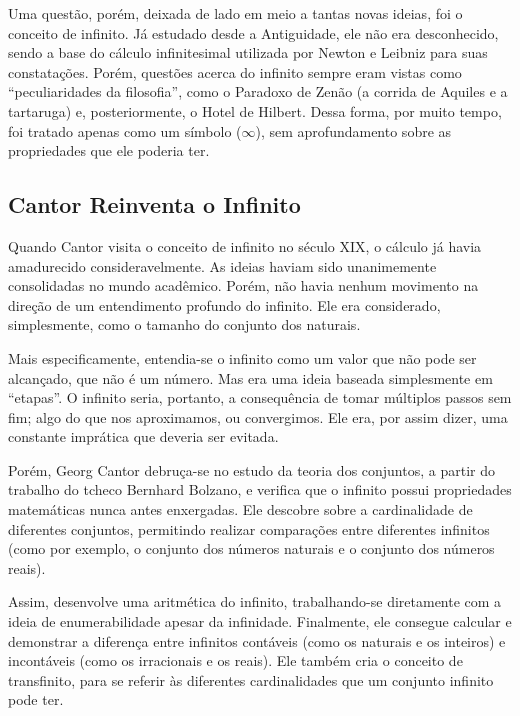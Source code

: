 \documentclass[journal,transmag]{IEEEtran}
\begin{document}
Uma questão, porém, deixada de lado em meio a tantas novas ideias,
foi o conceito de infinito. Já estudado desde a Antiguidade,
ele não era desconhecido, sendo a base do cálculo infinitesimal
utilizada por Newton e Leibniz para suas constatações.
Porém, questões acerca do infinito sempre eram vistas como
``peculiaridades da filosofia'', como o Paradoxo de Zenão
(a corrida de Aquiles e a tartaruga) e, posteriormente, o
Hotel de Hilbert. Dessa forma, por muito tempo, foi tratado apenas
como um símbolo ($\infty$), sem aprofundamento sobre as propriedades
que ele poderia ter.





\subsection{Cantor Reinventa o Infinito}
Quando Cantor visita o conceito de infinito no século XIX,
o cálculo já havia amadurecido consideravelmente. As ideias haviam
sido unanimemente consolidadas no mundo acadêmico. Porém, não havia
nenhum movimento na direção de um entendimento profundo do infinito.
Ele era considerado, simplesmente, como o tamanho do conjunto dos
naturais.

Mais especificamente, entendia-se o infinito como um valor que não pode ser alcançado, que não é um número. Mas era uma ideia baseada
simplesmente em ``etapas''. O infinito seria, portanto,
a consequência de tomar múltiplos passos sem fim; algo do que nos
aproximamos, ou convergimos. Ele era, por assim dizer, uma constante imprática que deveria ser evitada.

Porém, Georg Cantor debruça-se no estudo da teoria dos conjuntos,
a partir do trabalho do tcheco Bernhard Bolzano,
e verifica que o infinito possui propriedades matemáticas nunca
antes enxergadas. Ele descobre sobre a cardinalidade de diferentes
conjuntos, permitindo realizar comparações entre diferentes infinitos
(como por exemplo, o conjunto dos números naturais e o conjunto
dos números reais).

Assim, desenvolve uma aritmética do infinito,
trabalhando-se diretamente com a ideia de enumerabilidade apesar
da infinidade. Finalmente, ele consegue calcular e demonstrar a diferença entre
infinitos contáveis (como os naturais e os inteiros) e incontáveis (como os 
irracionais e os reais).
Ele também cria o conceito de transfinito, para se referir às
diferentes cardinalidades que um conjunto infinito pode ter.
\end{document}
